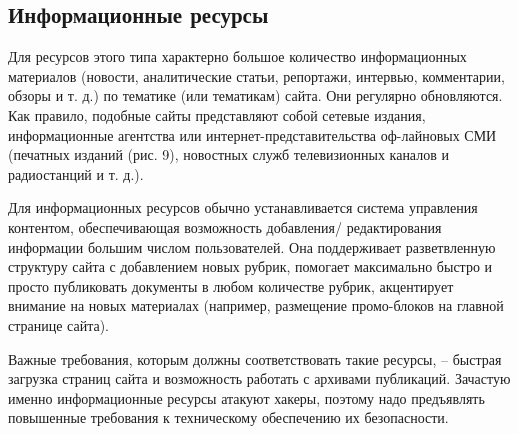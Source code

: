 \documentclass[a4paper,english,russian]{G2-105}
\begin{document}
\subsection{Информационные ресурсы}
\par Для ресурсов этого типа характерно большое количество информационных материалов (новости, аналитические статьи, репортажи, интервью, комментарии, обзоры и т. д.) по тематике (или тематикам) сайта. Они регулярно обновляются. Как правило, подобные сайты представляют собой сетевые издания, информационные агентства или интернет-представительства оф-лайновых СМИ (печатных изданий (рис. 9), новостных служб телевизионных каналов и радиостанций и т. д.).
\par Для информационных ресурсов обычно устанавливается система управления контентом, обеспечивающая возможность добавления/ редактирования информации большим числом пользователей. Она поддерживает разветвленную структуру сайта с добавлением новых рубрик, помогает максимально быстро и просто публиковать документы в любом количестве рубрик, акцентирует внимание на новых материалах (например, размещение промо-блоков на главной странице сайта).
\par Важные требования, которым должны соответствовать такие ресурсы, – быстрая загрузка страниц сайта и возможность работать с архивами публикаций. Зачастую именно информационные ресурсы атакуют хакеры, поэтому надо предъявлять повышенные требования к техническому обеспечению их безопасности.
\end{document}
